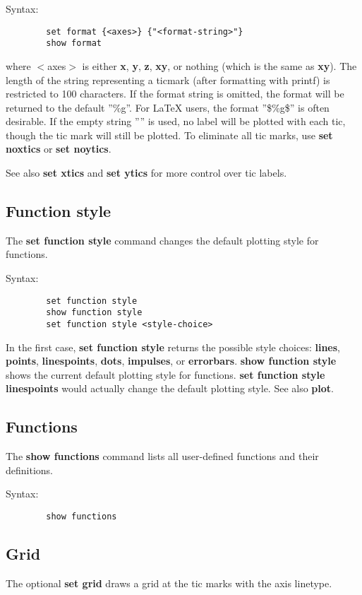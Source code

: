 Syntax:
\begin{verbatim}
        set format {<axes>} {"<format-string>"}
        show format
\end{verbatim}

where $<$axes$>$ is either {\bf x}, {\bf y}, {\bf z}, {\bf xy}, or nothing (which is the
same as {\bf xy}). The length of the string representing a ticmark (after
formatting with printf) is restricted to 100 characters.  If the
format string is omitted, the format will be returned to the default
''\%g''. For LaTeX users, the format ''\$\%g\$'' is often desirable.  If the
empty string '''' is used, no label will be plotted with each tic,
though the tic mark will still be plotted. To eliminate all tic marks,
use {\bf set noxtics} or {\bf set noytics}.

See also {\bf set xtics} and {\bf set ytics} for more control over tic labels.
\subsection{Function style}
The {\bf set function style} command changes the default plotting style
for functions.

Syntax:
\begin{verbatim}
        set function style 
        show function style 
        set function style <style-choice>
\end{verbatim}

In the first case, {\bf set function style} returns the possible style
choices:  {\bf lines}, {\bf points}, {\bf linespoints}, {\bf dots}, {\bf impulses}, 
or {\bf errorbars}.  {\bf show function style} shows the current default
plotting style for functions.  {\bf set function style linespoints}
would actually change the default plotting style.  See also {\bf plot}.
\subsection{Functions}
The {\bf show functions} command lists all user-defined functions and
their definitions.

Syntax:
\begin{verbatim}
        show functions
\end{verbatim}
\subsection{Grid}
The optional {\bf set grid} draws a grid at the tic marks with the axis
linetype.

